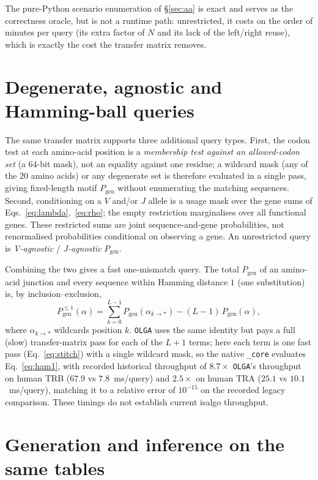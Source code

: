 \documentclass[11pt]{article}
\theoremstyle{oldplain}
\theoremstyle{oldrem}
\newcommand{\Pgen}{P_{\mathrm{gen}}}
\begin{document}
\noindent The pure-Python scenario enumeration of \S\ref{sec:aa} is exact and serves as the correctness
oracle, but is not a runtime path: unrestricted, it costs on the order of minutes per query (its extra
factor of $N$ and its lack of the left/right reuse), which is exactly the cost the transfer matrix
removes.

\section{Degenerate, agnostic and Hamming-ball queries}\label{sec:motif}

The same transfer matrix supports three additional query types. First, the
codon test at each amino-acid position is a \emph{membership test against an allowed-codon set} (a
$64$-bit mask), not an equality against one residue; a wildcard mask (any of the $20$ amino acids)
or any degenerate set is therefore evaluated in a single pass, giving fixed-length motif $\Pgen$ without
enumerating the matching sequences. Second, conditioning on a $V$ and/or $J$ allele is a usage mask
over the gene sums of Eqs.~\eqref{eq:lambda},~\eqref{eq:rho}; the empty restriction marginalises over
all functional genes. These restricted sums are joint sequence-and-gene probabilities,
not renormalised probabilities conditional on observing a gene. An unrestricted
query is \emph{V-agnostic} / \emph{J-agnostic} $\Pgen$.

Combining the two gives a fast one-mismatch query. The total $\Pgen$ of an amino-acid junction and every
sequence within Hamming distance $1$ (one substitution) is, by inclusion--exclusion,
\begin{equation}\label{eq:ham1}
  \Pgen^{\le 1}(\alpha)=\sum_{k=0}^{L-1}\Pgen(\alpha_{k\to *})-(L-1)\,\Pgen(\alpha),
\end{equation}
where $\alpha_{k\to *}$ wildcards position $k$. \texttt{OLGA} uses the same identity but pays a full
(slow) transfer-matrix pass for each of the $L{+}1$ terms; here each term is one fast pass
(Eq.~\eqref{eq:stitch}) with a single wildcard mask, so the native \texttt{\_core} evaluates
Eq.~\eqref{eq:ham1}, with recorded historical throughput of $8.7\times$ \texttt{OLGA}'s throughput on human TRB ($67.9$ vs $7.8$~ms/query)
and $2.5\times$ on human TRA ($25.1$ vs $10.1$~ms/query), matching it to a relative error of
$10^{-15}$ on the recorded legacy comparison. These timings do not establish current
isalgo throughput.

\section{Generation and inference on the same tables}\label{sec:em}
\end{document}
